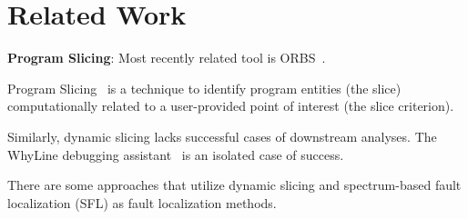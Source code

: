 \documentclass[sigplan,10pt,review,anonymous]{acmart}\settopmatter{printfolios=true,printccs=false,printacmref=false}
\begin{document}
%




\section{Related Work}


\textbf{Program Slicing}: Most recently related tool is ORBS~\cite{DBLP:conf/scam/BinkleyGHIKY15}. 

Program Slicing~\cite{Weiser:1981:PS:800078.802557} is a technique to
identify program entities (the slice) computationally related to a user-provided point of
interest (the slice criterion).

Similarly, dynamic slicing lacks successful cases of downstream
analyses. The WhyLine debugging assistant~\cite{whyline-website} is an
isolated case of success.


There are some approaches that utilize dynamic slicing and
spectrum-based fault localization (SFL) as fault localization methods.
\end{document}
